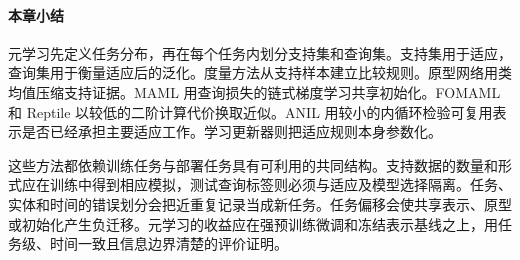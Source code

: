 \paragraph{本章小结}
元学习先定义任务分布，再在每个任务内划分支持集和查询集。支持集用于适应，查询集用于衡量适应后的泛化。度量方法从支持样本建立比较规则。原型网络用类均值压缩支持证据。MAML 用查询损失的链式梯度学习共享初始化。FOMAML 和 Reptile 以较低的二阶计算代价换取近似。ANIL 用较小的内循环检验可复用表示是否已经承担主要适应工作。学习更新器则把适应规则本身参数化。

这些方法都依赖训练任务与部署任务具有可利用的共同结构。支持数据的数量和形式应在训练中得到相应模拟，测试查询标签则必须与适应及模型选择隔离。任务、实体和时间的错误划分会把近重复记录当成新任务。任务偏移会使共享表示、原型或初始化产生负迁移。元学习的收益应在强预训练微调和冻结表示基线之上，用任务级、时间一致且信息边界清楚的评价证明。